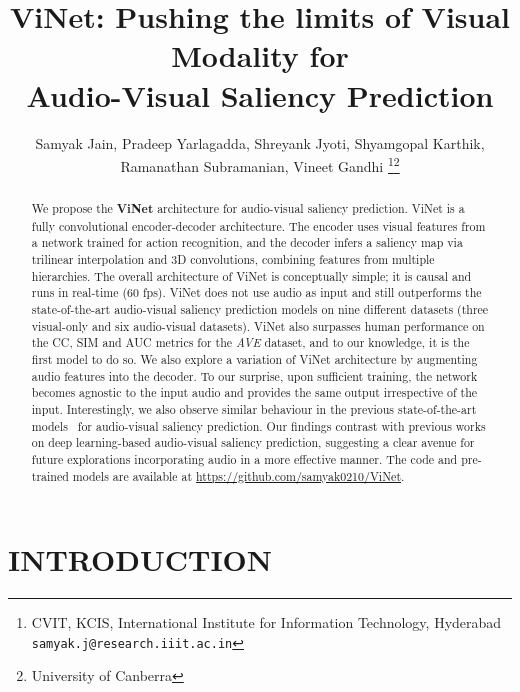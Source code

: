 \documentclass[letterpaper, 10 pt, conference]{ieeeconf}  \usepackage{times}
\title{\LARGE \bf
ViNet: Pushing the limits of Visual Modality for \\ Audio-Visual Saliency Prediction
}
\author{Samyak Jain,  Pradeep Yarlagadda,   Shreyank Jyoti,  Shyamgopal Karthik,  \\ Ramanathan Subramanian,  Vineet Gandhi \thanks{ CVIT, KCIS, International Institute for Information Technology, Hyderabad
        {\tt\small samyak.j@research.iiit.ac.in}}\thanks{University of Canberra}}
\begin{document}
\def\x{{\mathbf x}}
\def\L{{\cal L}}
\def\eg{\textit{e.g.}}
\def\ie{\textit{i.e. }}
\def\Eg{\textit{E.g.}}
\def\etal{\textit{et al.}}
\def\etc{\textit{etc}}


\maketitle
\thispagestyle{empty}
\pagestyle{empty}


\begin{abstract}
We propose the \textbf{ViNet} architecture for audio-visual saliency prediction. ViNet is a fully convolutional encoder-decoder architecture. The encoder uses visual features from a network trained for action recognition, and the decoder infers a saliency map via trilinear interpolation and 3D convolutions, combining features from multiple hierarchies. The overall architecture of ViNet is conceptually simple; it is causal and runs in real-time (60 fps). ViNet does not use audio as input and still outperforms the state-of-the-art audio-visual saliency prediction models on nine different datasets (three visual-only and six audio-visual datasets). ViNet also surpasses human performance on the CC, SIM and AUC metrics for the \emph{AVE} dataset, and to our knowledge, it is the first model to do so. We also explore a variation of ViNet architecture by augmenting audio features into the decoder. To our surprise, upon sufficient training, the network becomes agnostic to the input audio and provides the same output irrespective of the input. Interestingly, we also observe similar behaviour in the previous state-of-the-art models~\cite{tsiami2020stavis} for audio-visual saliency prediction. Our findings contrast with previous works on deep learning-based audio-visual saliency prediction, suggesting a clear avenue for future explorations incorporating audio in a more effective manner. The code and pre-trained models are available at \url{https://github.com/samyak0210/ViNet}. 





\end{abstract}


\section{INTRODUCTION}
\end{document}
